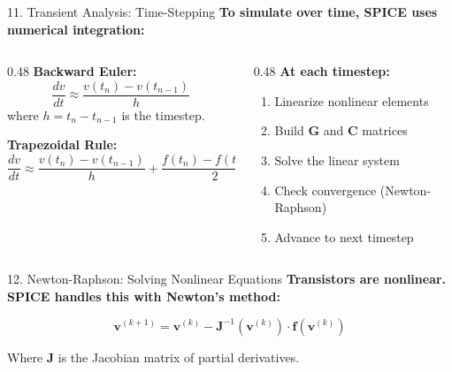 \documentclass[aspectratio=169, 11pt]{beamer}
\begin{document}
\begin{frame}{11. Transient Analysis: Time-Stepping}
    \textbf{To simulate over time, SPICE uses numerical integration:}

    \vspace{0.5em}
    \begin{columns}[T]
        \begin{column}{0.48\textwidth}
            \textbf{Backward Euler:}
            \[ \frac{dv}{dt} \approx \frac{v(t_n) - v(t_{n-1})}{h} \]
            where $h = t_n - t_{n-1}$ is the timestep.

            \vspace{0.5em}
            \textbf{Trapezoidal Rule:}
            \[ \frac{dv}{dt} \approx \frac{v(t_n) - v(t_{n-1})}{h} + \frac{f(t_n) - f(t_{n-1})}{2} \]
        \end{column}
        \begin{column}{0.48\textwidth}
            \textbf{At each timestep:}
            \begin{enumerate}
                \item Linearize nonlinear elements
                \item Build $\mathbf{G}$ and $\mathbf{C}$ matrices
                \item Solve the linear system
                \item Check convergence (Newton-Raphson)
                \item Advance to next timestep
            \end{enumerate}
        \end{column}
    \end{columns}
\end{frame}

\begin{frame}{12. Newton-Raphson: Solving Nonlinear Equations}
    \textbf{Transistors are nonlinear. SPICE handles this with Newton's method:}

    \vspace{0.5em}
    \[ \mathbf{v}^{(k+1)} = \mathbf{v}^{(k)} - \mathbf{J}^{-1}(\mathbf{v}^{(k)}) \cdot \mathbf{f}(\mathbf{v}^{(k)}) \]

    \vspace{0.5em}
    Where $\mathbf{J}$ is the Jacobian matrix of partial derivatives.

    \begin{center}
    \end{center}
\end{frame}
\end{document}
